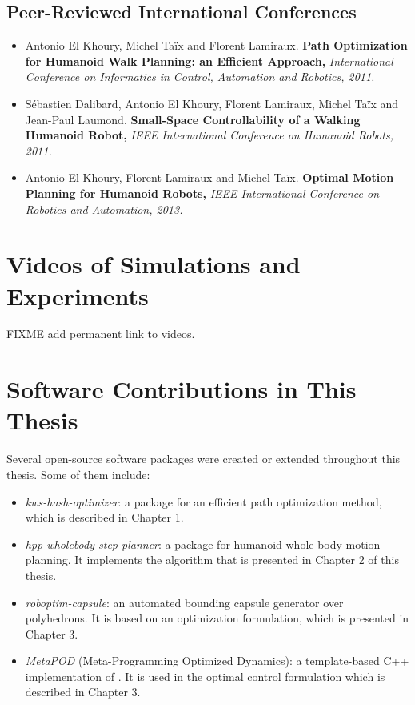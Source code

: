 \subsection*{Peer-Reviewed International Conferences}
\begin{itemize}
\item Antonio El Khoury, Michel Ta\"ix and Florent
  Lamiraux. \textbf{Path Optimization for Humanoid Walk Planning: an
    Efficient Approach,} \textit{International Conference on
    Informatics in Control, Automation and Robotics, 2011.}

\item S\'ebastien Dalibard, Antonio El Khoury, Florent Lamiraux,
  Michel Ta\"ix and Jean-Paul Laumond. \textbf{Small-Space
    Controllability of a Walking Humanoid Robot,} \textit{IEEE
    International Conference on Humanoid Robots, 2011.}

\item Antonio El Khoury, Florent Lamiraux and Michel
  Ta\"ix. \textbf{Optimal Motion Planning for Humanoid Robots,}
  \textit{IEEE International Conference on Robotics and Automation,
    2013.}
\end{itemize}

\section{Videos of Simulations and Experiments}

FIXME add permanent link to videos.

\section{Software Contributions in This Thesis}

Several open-source software packages were created or extended
throughout this thesis. Some of them include:

\begin{itemize}
  \item \textit{kws-hash-optimizer}: a package for an efficient path
    optimization method, which is described in Chapter 1.
  \item \textit{hpp-wholebody-step-planner}: a package for humanoid whole-body
    motion planning. It implements the algorithm that is presented in
    Chapter 2 of this thesis.
  \item \textit{roboptim-capsule}: an automated bounding capsule generator over
    polyhedrons. It is based on an optimization formulation, which is
    presented in Chapter 3.
  \item \textit{MetaPOD} (Meta-Programming Optimized Dynamics): a
    template-based C++ implementation of \cite{feat08}. It is used in
    the optimal control formulation which is described in Chapter 3.
\end{itemize}
